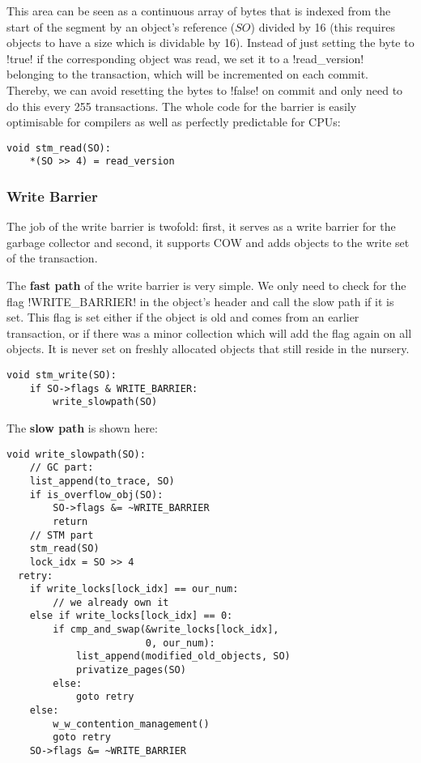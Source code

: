 \documentclass{sigplanconf}
\makeatletter
\renewcommand\lstinline[1][]{%
  \Collectverb{\@@myverb}%
}
\def\@@myverb#1{%
    \begingroup
    \fboxsep=0.2em
    \colorbox{verylightgray}{\oldlstinline|#1|}%
    \endgroup
}
\makeatother
\begin{document}
This area can be seen as a continuous array of bytes that is indexed
from the start of the segment by an object's reference ($SO$) divided
by 16 (this requires objects to have a size which is dividable by 16).
Instead of just setting the byte to \lstinline!true!  if the
corresponding object was read, we set it to a \lstinline!read_version!
belonging to the transaction, which will be incremented on each
commit.  Thereby, we can avoid resetting the bytes to
\lstinline!false!  on commit and only need to do this every 255
transactions. The whole code for the barrier is easily optimisable for
compilers as well as perfectly predictable for CPUs:

\begin{lstlisting}
void stm_read(SO):
    *(SO >> 4) = read_version
\end{lstlisting}



\subsubsection{Write Barrier}

The job of the write barrier is twofold: first, it serves as a write
barrier for the garbage collector and second, it supports COW and adds
objects to the write set of the transaction.

The \textbf{fast path} of the write barrier is very simple. We only
need to check for the flag \lstinline!WRITE_BARRIER!  in the object's
header and call the slow path if it is set. This flag is set either if
the object is old and comes from an earlier transaction, or if there
was a minor collection which will add the flag again on all
objects. It is never set on freshly allocated objects that still
reside in the nursery.

\begin{lstlisting}
void stm_write(SO):
	if SO->flags & WRITE_BARRIER:
		write_slowpath(SO)
\end{lstlisting}


The \textbf{slow path} is shown here:

\begin{lstlisting}
void write_slowpath(SO):
	// GC part:
	list_append(to_trace, SO)
	if is_overflow_obj(SO):
		SO->flags &= ~WRITE_BARRIER
		return
	// STM part
	stm_read(SO)
	lock_idx = SO >> 4
  retry:
	if write_locks[lock_idx] == our_num:
		// we already own it
	else if write_locks[lock_idx] == 0:
		if cmp_and_swap(&write_locks[lock_idx],
					    0, our_num):
			list_append(modified_old_objects, SO)
			privatize_pages(SO)
		else:
			goto retry
	else:
		w_w_contention_management()
		goto retry
	SO->flags &= ~WRITE_BARRIER
\end{lstlisting}
\end{document}
